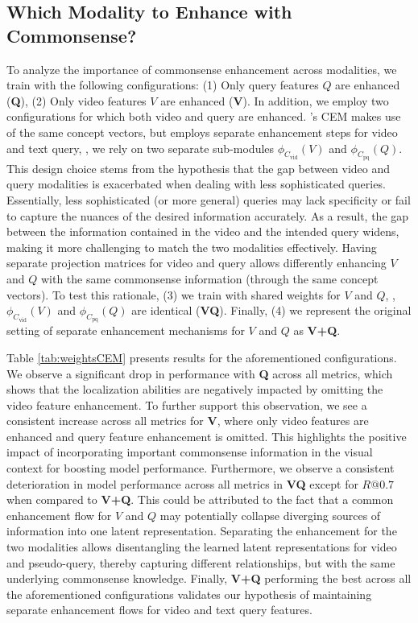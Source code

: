 \subsection{Which Modality to Enhance with Commonsense?}
\label{ablation:cem}
To analyze the importance of commonsense enhancement across modalities, we train \modelname with the following configurations: (1) Only query features $Q$ are enhanced (\textbf{Q}), (2) Only video features $V$ are enhanced (\textbf{V}). In addition, we employ two configurations for which both video and query are enhanced. \modelname's CEM makes use of the same concept vectors, but employs separate enhancement steps for video and text query, \ie, we rely on two separate sub-modules $\phi_{C_{\text{vid}}}(V)$ and $\phi_{C_{\text{pq}}}(Q)$. This design choice stems from the hypothesis that the gap between video and query modalities is exacerbated when dealing with less sophisticated queries. Essentially, less sophisticated (or more general) queries may lack specificity or fail to capture the nuances of the desired information accurately. As a result, the gap between the information contained in the video and the intended query widens, making it more challenging to match the two modalities effectively. 
Having separate projection matrices for video and query allows differently enhancing $V$ and $Q$  with the same commonsense information (through the same concept vectors). 
To test this rationale, (3) we train \modelname with shared weights for $V$ and $Q$, \ie, $\phi_{C_{\text{vid}}}(V)$ and $\phi_{C_{\text{pq}}}(Q)$ are identical (\textbf{VQ}). Finally, (4) we represent the original setting of separate enhancement mechanisms for $V$ and $Q$ as \textbf{V+Q}.


Table \ref{tab:weightsCEM} presents results for the aforementioned configurations. We observe a significant drop in performance with \textbf{Q} across all metrics, which shows that the localization abilities are negatively impacted by omitting the video feature enhancement. To further support this observation, we see a consistent increase across all metrics for \textbf{V}, where only video features are enhanced and query feature enhancement is omitted. This highlights the positive impact of incorporating important commonsense information in the visual context for boosting model performance. 
Furthermore, we observe a consistent deterioration in model performance across all metrics in \textbf{VQ} except for $R@0.7$ when compared to \textbf{V+Q}. This could be attributed to the fact that a common enhancement flow for $V$ and $Q$ may potentially collapse diverging sources of information into one latent representation. Separating the enhancement for the two modalities allows disentangling the learned latent representations for video and pseudo-query, thereby capturing different relationships, but with the same underlying commonsense knowledge. Finally, \textbf{V+Q} performing the best across all the aforementioned configurations validates our hypothesis of maintaining separate enhancement flows for video and text query features.
